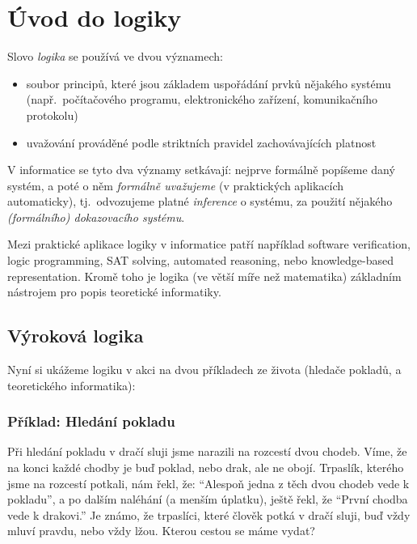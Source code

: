\chapter{Úvod do logiky}


Slovo \emph{logika} se používá ve dvou významech:
\begin{itemize}
    \item soubor principů, které jsou základem uspořádání prvků nějakého systému (např.\ počítačového programu, elektronického zařízení, komunikačního protokolu)
    \item uvažování prováděné podle striktních pravidel zachovávajících platnost
\end{itemize}
V informatice se tyto dva významy setkávají: nejprve formálně popíšeme daný systém, a poté o něm \emph{formálně uvažujeme} (v praktických aplikacích automaticky), tj.\ odvozujeme platné \emph{inference} o systému, za použití nějakého \emph{(formálního) dokazovacího systému}.

Mezi praktické aplikace logiky v informatice patří například software verification, logic programming, SAT solving, automated reasoning, nebo knowledge-based representation. Kromě toho je logika (ve větší míře než matematika) základním nástrojem pro popis teoretické informatiky. %



\section{Výroková logika}

Nyní si ukážeme logiku v akci na dvou příkladech ze života (hledače pokladů, a teoretického informatika):


\subsection{Příklad: Hledání pokladu}

\begin{tcolorbox}
\begin{example}
Při hledání pokladu v dračí sluji jsme narazili na rozcestí dvou chodeb. Víme, že na konci každé chodby je buď poklad, nebo drak, ale ne obojí. Trpaslík, kterého jsme na rozcestí potkali, nám řekl, že: ``Alespoň jedna z těch dvou chodeb vede k pokladu'', a po dalším naléhání (a menším úplatku), ještě řekl, že ``První chodba vede k drakovi.'' Je známo, že trpaslíci, které člověk potká v dračí sluji, buď vždy mluví pravdu, nebo vždy lžou. Kterou cestou se máme vydat?
\end{example}
\end{tcolorbox}

